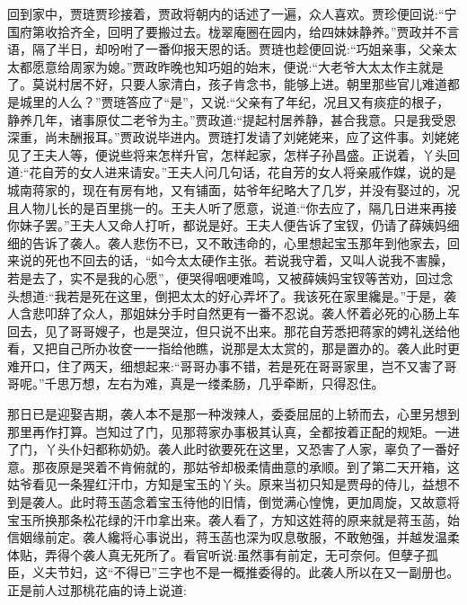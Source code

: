 \begin{parag}
    回到家中，贾琏贾珍接着，贾政将朝内的话述了一遍，众人喜欢。贾珍便回说:“宁国府第收拾齐全，回明了要搬过去。栊翠庵圈在园内，给四妹妹静养。”贾政并不言语，隔了半日，却吩咐了一番仰报天恩的话。贾琏也趁便回说:“巧姐亲事，父亲太太都愿意给周家为媳。”贾政昨晚也知巧姐的始末，便说:“大老爷大太太作主就是了。莫说村居不好，只要人家清白，孩子肯念书，能够上进。朝里那些官儿难道都是城里的人么？”贾琏答应了“是”，又说:“父亲有了年纪，况且又有痰症的根子，静养几年，诸事原仗二老爷为主。”贾政道:“提起村居养静，甚合我意。只是我受恩深重，尚未酬报耳。”贾政说毕进内。贾琏打发请了刘姥姥来，应了这件事。刘姥姥见了王夫人等，便说些将来怎样升官，怎样起家，怎样子孙昌盛。正说着，丫头回道:“花自芳的女人进来请安。”王夫人问几句话，花自芳的女人将亲戚作媒，说的是城南蒋家的，现在有房有地，又有铺面，姑爷年纪略大了几岁，并没有娶过的，况且人物儿长的是百里挑一的。王夫人听了愿意，说道:“你去应了，隔几日进来再接你妹子罢。”王夫人又命人打听，都说是好。王夫人便告诉了宝钗，仍请了薛姨妈细细的告诉了袭人。袭人悲伤不已，又不敢违命的，心里想起宝玉那年到他家去，回来说的死也不回去的话，“如今太太硬作主张。若说我守着，又叫人说我不害臊，若是去了，实不是我的心愿”，便哭得咽哽难鸣，又被薛姨妈宝钗等苦劝，回过念头想道:“我若是死在这里，倒把太太的好心弄坏了。我该死在家里纔是。”于是，袭人含悲叩辞了众人，那姐妹分手时自然更有一番不忍说。袭人怀着必死的心肠上车回去，见了哥哥嫂子，也是哭泣，但只说不出来。那花自芳悉把蒋家的娉礼送给他看，又把自己所办妆奁一一指给他瞧，说那是太太赏的，那是置办的。袭人此时更难开口，住了两天，细想起来:“哥哥办事不错，若是死在哥哥家里，岂不又害了哥哥呢。”千思万想，左右为难，真是一缕柔肠，几乎牵断，只得忍住。
\end{parag}


\begin{parag}
    那日已是迎娶吉期，袭人本不是那一种泼辣人，委委屈屈的上轿而去，心里另想到那里再作打算。岂知过了门，见那蒋家办事极其认真，全都按着正配的规矩。一进了门，丫头仆妇都称奶奶。袭人此时欲要死在这里，又恐害了人家，辜负了一番好意。那夜原是哭着不肯俯就的，那姑爷却极柔情曲意的承顺。到了第二天开箱，这姑爷看见一条猩红汗巾，方知是宝玉的丫头。原来当初只知是贾母的侍儿，益想不到是袭人。此时蒋玉菡念着宝玉待他的旧情，倒觉满心惶愧，更加周旋，又故意将宝玉所换那条松花绿的汗巾拿出来。袭人看了，方知这姓蒋的原来就是蒋玉菡，始信姻缘前定。袭人纔将心事说出，蒋玉菡也深为叹息敬服，不敢勉强，并越发温柔体贴，弄得个袭人真无死所了。看官听说:虽然事有前定，无可奈何。但孽子孤臣，义夫节妇，这“不得已”三字也不是一概推委得的。此袭人所以在又一副册也。正是前人过那桃花庙的诗上说道:
\end{parag}


